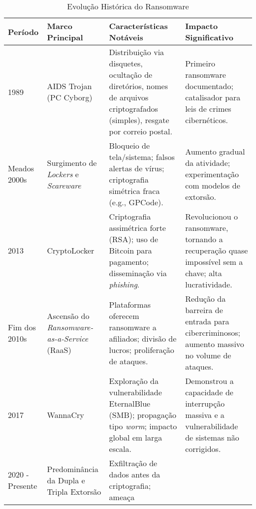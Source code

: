 
\begin{table}[H] %
    \centering
    \small
    \caption{Evolução Histórica do Ransomware}
    \label{tab:evolucao_historica}
    \sloppy %
    \begin{tabularx}{\textwidth}{|l|p{3cm}|p{5cm}|p{5cm}|}
        \hline
        \textbf{Período} & \textbf{Marco Principal} & \textbf{Características Notáveis} & \textbf{Impacto Significativo} \\ \hline
        1989 & AIDS Trojan (PC Cyborg) & Distribuição via disquetes, ocultação de diretórios, nomes de arquivos criptografados 
        (simples), resgate por correio postal. & Primeiro ransomware documentado; catalisador para leis de crimes cibernéticos. 
        \cite{CyberMaxxRansomwareHistory, Muniandy2024Ransomware, WatchGuardAIDSTrojan} \\ \hline
        Meados 2000s & Surgimento de \textit{Lockers} e \textit{Scareware} & Bloqueio de tela/sistema; falsos alertas de vírus; 
        criptografia simétrica fraca (e.g., GPCode). & Aumento gradual da atividade; experimentação com modelos de extorsão. 
        \cite{Tanni2022RedAlert, MasterDCRansomwareHowItWorks, Robb2024RansomwareHistory} \\ \hline
        2013 & CryptoLocker & Criptografia assimétrica forte (RSA); uso de Bitcoin para pagamento; disseminação via 
        \textit{phishing}. & Revolucionou o ransomware, tornando a recuperação quase impossível sem a chave; alta lucratividade. 
        \cite{CyberMaxxRansomwareHistory, Muniandy2024Ransomware, Robb2024RansomwareHistory} \\ \hline
        Fim dos 2010s & Ascensão do \textit{Ransomware-as-a-Service} (RaaS) & Plataformas oferecem ransomware a afiliados; 
        divisão de lucros; proliferação de ataques. & Redução da barreira de entrada para cibercriminosos; aumento massivo no 
        volume de ataques. \cite{CyberMaxxRansomwareHistory, Robb2024RansomwareHistory} \\ \hline
        2017 & WannaCry & Exploração da vulnerabilidade EternalBlue (SMB); propagação tipo \textit{worm}; impacto global em 
        larga escala. & Demonstrou a capacidade de interrupção massiva e a vulnerabilidade de sistemas não corrigidos. 
        \cite{CyberMaxxRansomwareHistory, WikipediaWannaCry} \\ \hline
        2020 - Presente & Predominância da Dupla e Tripla Extorsão & Exfiltração de dados antes da criptografia; ameaça 

\end{tabularx}
\end{table}
